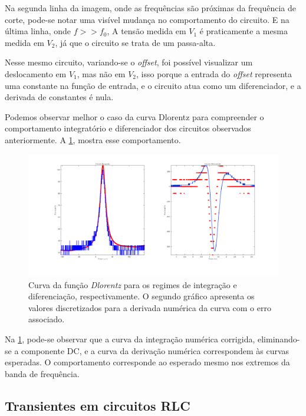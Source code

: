 \documentclass[11pt,a4paper]{article}
\begin{document}
    Na segunda linha da imagem, onde as frequências são próximas da frequência de corte, pode-se notar uma visível mudança no comportamento do circuito. E na última linha, onde $f >> f_0$, A tensão medida em $V_1$ é praticamente a mesma medida em $V_2$, já que o circuito se trata de um passa-alta.
    
    Nesse mesmo circuito, variando-se o \textit{offset}, foi possível visualizar um deslocamento em $V_1$, mas não em $V_2$, isso porque a entrada do \textit{offset} representa uma constante na função de entrada, e o circuito atua como um diferenciador, e a derivada de constantes é nula.
    
    Podemos observar melhor o caso da curva Dlorentz para compreender o comportamento integratório e diferenciador dos circuitos observados anteriormente. A \cref{Dlorentz}, mostra esse comportamento.

        \begin{figure}[!htb]
        \centering
        \includegraphics[scale=0.4]{Dlorentz.png}
        \caption{Curva da função \textit{Dlorentz} para os regimes de integração e diferenciação, respectivamente. O segundo gráfico apresenta os valores discretizados para a derivada numérica da curva com o erro associado.}
        \label{Dlorentz}
        \end{figure}
        
    Na \cref{Dlorentz}, pode-se observar que a curva da integração numérica corrigida, eliminando-se a componente DC, e a curva da derivação numérica correspondem às curvas esperadas. O comportamento corresponde ao esperado mesmo nos extremos da banda de frequência.
    
    
    \subsection{Transientes em circuitos RLC}
    
\end{document}
